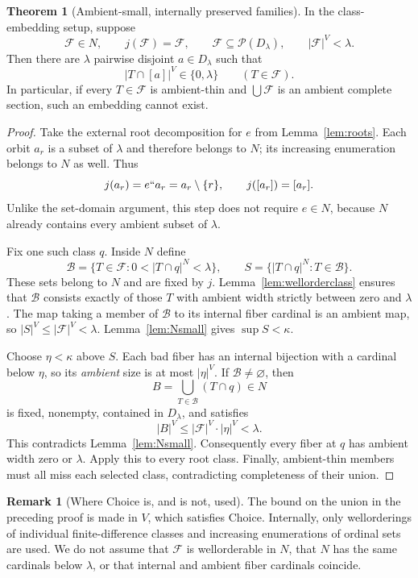 \documentclass[11pt,letterpaper]{article}
\theoremstyle{definition}
\newtheorem{theorem}[definition]{Theorem}
\newtheorem{remark}[definition]{Remark}
\numberwithin{equation}{section}
\newcommand{\Pow}{\mathcal P}
\newcommand{\FF}{\mathcal F}
\newcommand{\calB}{\mathcal B}
\begin{document}
\begin{theorem}[Ambient-small, internally preserved families]\label{thm:N}
In the class-embedding setup, suppose
\[
 \FF\in N,\qquad j(\FF)=\FF,\qquad
 \FF\subseteq\Pow(D_\lambda),\qquad |\FF|^V<\lambda.
\]
Then there are $\lambda$ pairwise disjoint $a\in D_\lambda$ such that
\[
                |T\cap[a]|^V\in\{0,\lambda\}
                       \qquad(T\in\FF).
\]
In particular, if every $T\in\FF$ is ambient-thin and $\bigcup\FF$ is an ambient complete section, such an embedding cannot exist.
\end{theorem}

\begin{proof}
Take the external root decomposition for $e$ from Lemma~\ref{lem:roots}. Each orbit $a_r$ is a subset of $\lambda$ and therefore belongs to $N$; its increasing enumeration belongs to $N$ as well. Thus
\[
                  j(a_r)=e``a_r=a_r\setminus\{r\},
                  \qquad j([a_r])=[a_r].
\]
Unlike the set-domain argument, this step does not require $e\in N$, because $N$ already contains every ambient subset of $\lambda$.

Fix one such class $q$. Inside $N$ define
\[
 \calB=\{T\in\FF:0<|T\cap q|^N<\lambda\},
 \qquad S=\{|T\cap q|^N:T\in\calB\}.
\]
These sets belong to $N$ and are fixed by $j$. Lemma~\ref{lem:wellorderclass} ensures that $\calB$ consists exactly of those $T$ with ambient width strictly between zero and $\lambda$. The map taking a member of $\calB$ to its internal fiber cardinal is an ambient map, so $|S|^V\le|\FF|^V<\lambda$. Lemma~\ref{lem:Nsmall} gives $\sup S<\kappa$.

Choose $\eta<\kappa$ above $S$. Each bad fiber has an internal bijection with a cardinal below $\eta$, so its \emph{ambient} size is at most $|\eta|^V$. If $\calB\ne\varnothing$, then
\[
 B=\bigcup_{T\in\calB}(T\cap q)\in N
\]
is fixed, nonempty, contained in $D_\lambda$, and satisfies
\[
              |B|^V\le |\FF|^V\cdot|\eta|^V<\lambda.
\]
This contradicts Lemma~\ref{lem:Nsmall}. Consequently every fiber at $q$ has ambient width zero or $\lambda$. Apply this to every root class. Finally, ambient-thin members must all miss each selected class, contradicting completeness of their union.
\end{proof}

\begin{remark}[Where Choice is, and is not, used]
The bound on the union in the preceding proof is made in $V$, which satisfies Choice. Internally, only wellorderings of individual finite-difference classes and increasing enumerations of ordinal sets are used. We do not assume that $\FF$ is wellorderable in $N$, that $N$ has the same cardinals below $\lambda$, or that internal and ambient fiber cardinals coincide.
\end{remark}
\end{document}
